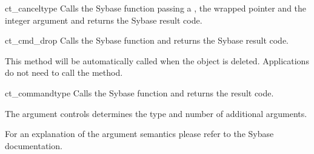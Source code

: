 \begin{methoddesc}[CS_COMMAND]{ct_cancel}{type}
Calls the Sybase  function passing a 
, the wrapped  pointer and the
integer  argument and returns the Sybase result code.
\end{methoddesc}

\begin{methoddesc}[CS_COMMAND]{ct_cmd_drop}{}
Calls the Sybase  function and returns the
Sybase result code.

This method will be automatically called when the 
object is deleted.  Applications do not need to call the method.
\end{methoddesc}

\begin{methoddesc}[CS_COMMAND]{ct_command}{type \optional{, \ldots}}
Calls the Sybase  function and returns the
result code.

The  argument controls determines the type and number of
additional arguments.






For an explanation of the argument semantics please refer to the
Sybase documentation.
\end{methoddesc}

